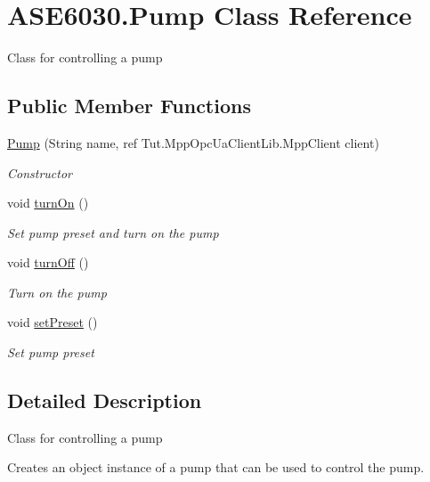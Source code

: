 \hypertarget{class_a_s_e6030_1_1_pump}{}\section{A\+S\+E6030.\+Pump Class Reference}
\label{class_a_s_e6030_1_1_pump}


Class for controlling a pump  


\subsection*{Public Member Functions}
\begin{DoxyCompactItemize}
\item 
\hyperlink{class_a_s_e6030_1_1_pump_ac23356a1375f9dc895beeb922721635d}{Pump} (String name, ref Tut.\+Mpp\+Opc\+Ua\+Client\+Lib.\+Mpp\+Client client)
\begin{DoxyCompactList}\small\item\em Constructor \end{DoxyCompactList}\item 
void \hyperlink{class_a_s_e6030_1_1_pump_a80e39e01a6a3fdf187f743991004c4ed}{turn\+On} ()
\begin{DoxyCompactList}\small\item\em Set pump preset and turn on the pump \end{DoxyCompactList}\item 
void \hyperlink{class_a_s_e6030_1_1_pump_aeaca891e7c6220bf12e070c4096c8140}{turn\+Off} ()
\begin{DoxyCompactList}\small\item\em Turn on the pump \end{DoxyCompactList}\item 
void \hyperlink{class_a_s_e6030_1_1_pump_a25c0c51e6e9fbddecdf94f3523b971ad}{set\+Preset} ()
\begin{DoxyCompactList}\small\item\em Set pump preset \end{DoxyCompactList}\end{DoxyCompactItemize}


\subsection{Detailed Description}
Class for controlling a pump 

Creates an object instance of a pump that can be used to control the pump. 


